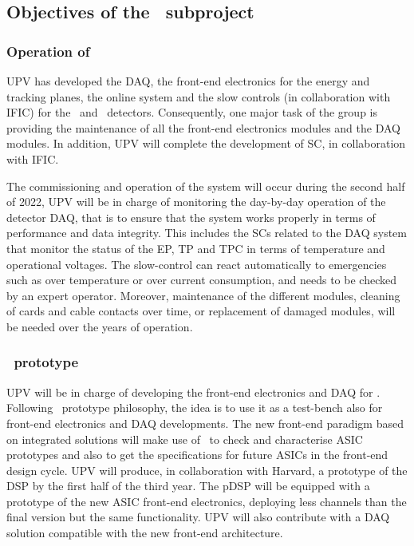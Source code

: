 \subsection{Objectives of the \sUPV\ subproject}
\label{sec.obj.upv}
\subsubsection*{Operation of \Next}

UPV has developed the DAQ, the front-end electronics for the energy and tracking planes, the online system and the slow controls (in collaboration with IFIC) for the \NEW\ and \Next\ detectors. Consequently, one major task of the group is   providing the maintenance of all the front-end electronics modules and the DAQ modules. In addition, UPV will complete the development of SC, in collaboration with IFIC. 

The commissioning and operation of the system will occur during the second half of 2022, UPV will be in charge of monitoring the day-by-day operation of the detector DAQ, that is to ensure that the system works properly in terms of performance and data integrity. This includes the SCs related to the DAQ system that monitor the status of the EP, TP and TPC in terms of temperature and operational voltages. The slow-control can react automatically to emergencies such as over temperature or over current consumption, and needs to be checked by an expert operator. Moreover, maintenance of the different modules, cleaning of cards and cable contacts over time, or replacement of damaged modules, will be needed over the years of operation.


\subsubsection*{\HDEMO\ prototype}

UPV will be in charge of developing the front-end electronics and DAQ for \HDEMO.
Following \HDEMO\  prototype philosophy, the idea is to use it as a test-bench also for front-end electronics and DAQ developments. The new front-end paradigm based on integrated solutions will make use of \HDEMO\ to check and characterise ASIC prototypes and also to get the specifications for future ASICs in the front-end design cycle. UPV will produce, in collaboration with Harvard, a prototype of the DSP by the first half of the third year.  The pDSP will be equipped with a prototype of the new ASIC front-end electronics, deploying less channels than the final version but the same functionality. UPV will also contribute with a DAQ solution compatible with the new front-end architecture.

